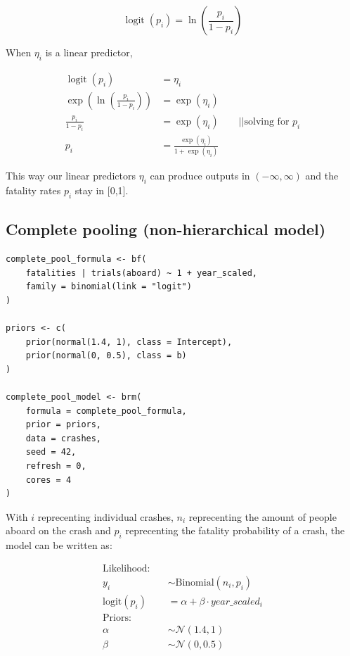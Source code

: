 \documentclass[12pt,a4paper]{article}
\begin{document}
\[
  \operatorname{logit}(p_i) = \ln\left(\frac{p_i}{1-p_i}\right)
\]

When $\eta_i$ is a linear predictor,

\begin{align*}
  \operatorname{logit}(p_i)                          & = \eta_i                                             \\
  \exp\left(\ln\left(\frac{p_i}{1-p_i}\right)\right) & = \exp(\eta_i)                                       \\
  \frac{p_i}{1-p_i}                                  & = \exp(\eta_i) \quad \quad || \text{solving for }p_i \\
  p_i                                                & = \frac{\exp(\eta_i)}{1 + \exp(\eta_i)}
\end{align*}

This way our linear predictors $\eta_i$ can produce outputs in $(-\infty, \infty)$ and the fatality rates $p_i$ stay in [0,1].

\subsection{Complete pooling (non-hierarchical model)}

\begin{lstlisting}
complete_pool_formula <- bf(
    fatalities | trials(aboard) ~ 1 + year_scaled,
    family = binomial(link = "logit")
)

priors <- c(
    prior(normal(1.4, 1), class = Intercept),
    prior(normal(0, 0.5), class = b)
)

complete_pool_model <- brm(
    formula = complete_pool_formula,
    prior = priors,
    data = crashes,
    seed = 42,
    refresh = 0,
    cores = 4
)
\end{lstlisting}

With $i$ reprecenting individual crashes, $n_i$ reprecenting the amount of people aboard on the crash and $p_i$ reprecenting the fatality probability of a crash, the model can be written as:

\begin{align*}
  \text{Likelihood:} \quad &                                       \\
  y_i                      & \sim \text{Binomial}(n_i, p_i)        \\
  \text{logit}(p_i)        & = \alpha + \beta \cdot year\_scaled_i \\[1em]
  \text{Priors:} \quad     &                                       \\
  \alpha                   & \sim \mathcal{N}(1.4, 1)              \\
  \beta                    & \sim \mathcal{N}(0, 0.5)
\end{align*}
\end{document}
